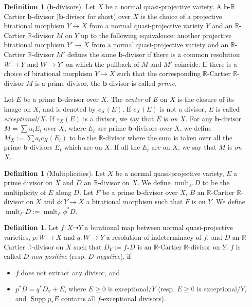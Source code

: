 \documentclass[11pt]{amsart}
\numberwithin{equation}{section}
\newcommand{\bb}{\bm{b}}
\newcommand{\Rr}{\mathbb{R}}
\newcommand{\Supp}{\operatorname{Supp}}
\newcommand{\mult}{\operatorname{mult}}
\theoremstyle{definition}
\newtheorem{defn}[thm]{Definition}
\theoremstyle{definition}
\theoremstyle{definition}
\begin{document}
\begin{defn}[$\bb$-divisors] Let $X$ be a normal quasi-projective variety. A $\bb$-$\Rr$ Cartier $\bb$-divisor ($\bb$-divisor for short) over $X$ is the choice of a projective birational morphism $Y\to X$ from a normal quasi-projective variety $Y$ and an $\Rr$-Cartier $\mathbb R$-divisor $M$ on $Y$ up to the following equivalence: another projective birational morphism $Y'\to X$ from a normal quasi-projective variety and an $\Rr$-Cartier $\Rr$-divisor $M'$ defines the same $\bb$-divisor if there is a common resolution $W\to Y$ and $W\to Y'$ on which the pullback of $M$ and $M'$ coincide. If there is a choice of birational morphism $Y\rightarrow X$ such that the corresponding $\Rr$-Cartier $\Rr$-divisor $M$ is a prime divisor, the $\bb$-divisor is called \emph{prime}.

	Let $E$ be a prime $\bb$-divisor over $X$. The \emph{center} of $E$ on $X$ is the closure of its image on $X$, and is denoted by $c_X(E)$. If $c_X(E)$ is not a divisor, $E$ is called \emph{exceptional}$/X$. If $c_X(E)$ is a divisor, we say that $E$ is \emph{on} $X$. For any $\bb$-divisor $M=\sum a_iE_i$ over $X$, where $E_i$ are prime $\bb$-divisors over $X$, we define $M_X:=\sum a_ic_X(E_i)$ to be the $\Rr$-divisor where the sum is taken over all the prime $\bb$-divisors $E_i$ which are on $X$. If all the $E_i$ are on $X$, we say that $M$ is \emph{on} $X$. 
\end{defn}

\begin{defn}[Multiplicities] Let $X$ be a normal quasi-projective variety, $E$ a prime divisor on $X$ and $D$ an $\Rr$-divisor on $X$. We define $\mult_ED$ to be the multiplicity of $E$ along $D$. 
Let $F$ be a prime $\bb$-divisor over $X$, $B$ an $\Rr$-Cartier $\Rr$-divisor on $X$ and $\phi: Y\to X$ a birational morphism such that $F$ is on $Y$. We define $\mult_FD:=\mult_F\phi^*D$.
\end{defn}


\begin{defn} Let $f: X\dashrightarrow Y$ a birational map between normal quasi-projective varieties, $p: W\rightarrow X$ and $q: W\rightarrow Y$ a resolution of indeterminacy of $f$, and $D$ an $\Rr$-Cartier $\Rr$-divisor on $X$ such that $D_Y:=f_*D$ is an $\Rr$-Cartier $\Rr$-divisor on $Y$. $f$ is called \emph{$D$-non-positive} (resp. \emph{$D$-negative}), if
\begin{itemize}
    \item $f$ does not extract any divisor, and
    \item $p^*D=q^*D_Y+E$, where $E\geq 0$ is exceptional$/Y$ (resp. $E\geq 0$ is exceptional$/Y$, and $\Supp p_*E$ contains all $f$-exceptional divisors). 
\end{itemize}
\end{defn}
\end{document}
